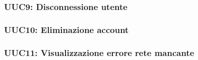 \documentclass[../analisi-dei-requisiti.tex]{subfiles}
\begin{document}


\subsubsection{UUC9: Disconnessione utente}%
\label{subs:UU9}



\subsubsection{UUC10: Eliminazione account}%
\label{subs:UUC10}



\subsubsection{UUC11: Visualizzazione errore rete mancante}%
\label{subs:UUC11}


\end{document}
